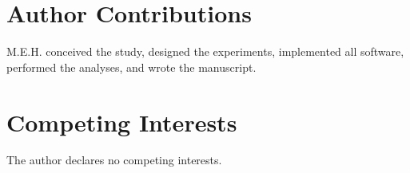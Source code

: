 \documentclass[11pt,a4paper]{article}
\begin{document}
\section*{Author Contributions}

M.E.H. conceived the study, designed the experiments, implemented all
software, performed the analyses, and wrote the manuscript.

\section*{Competing Interests}

The author declares no competing interests.




\end{document}

